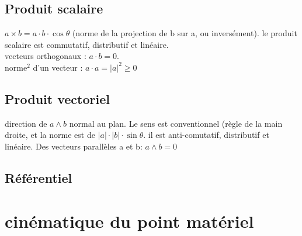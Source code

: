 \documentclass[12pt,a4paper]{article}
\begin{document}
\subsection{Produit scalaire}
$a\times b = a \cdot b \cdot \cos\theta$ (norme de la projection de b sur a, ou inversément).
le produit scalaire est commutatif, distributif et linéaire. 
\\vecteurs orthogonaux : $a \cdot b = 0$. 
\\norme$^2$ d'un vecteur : $a \cdot a = |a|^2 \geq 0$
\subsection{Produit vectoriel}
direction de $a \wedge b$ normal au plan. Le sens est conventionnel (règle de la main droite, et la norme est de $|a| \cdot |b| \cdot \sin \theta$. il est anti-comutatif, distributif et linéaire. Des vecteurs parallèles a et b: $a \wedge b = 0$
\subsection{Référentiel}
\section{cinématique du point matériel}
\end{document}
